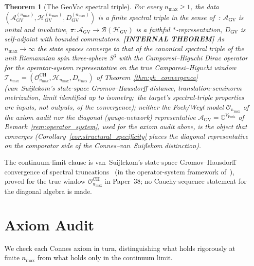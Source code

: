 \documentclass[11pt]{article}
\newtheorem{theorem}{Theorem}
\begin{document}
\begin{theorem}[The GeoVac spectral triple]
\label{thm:GV_triple}
For every $n_{\max} \ge 1$, the data
$(\mathcal{A}_{\mathrm{GV}}^{(n_{\max})},
\mathcal{H}_{\mathrm{GV}}^{(n_{\max})},
D_{\mathrm{GV}}^{(n_{\max})})$ is a finite spectral triple in the
sense of~\cite{connes1995}: $\mathcal{A}_{\mathrm{GV}}$ is unital and
involutive, $\pi: \mathcal{A}_{\mathrm{GV}} \to
\mathcal{B}(\mathcal{H}_{\mathrm{GV}})$ is a faithful
$*$-representation, $D_{\mathrm{GV}}$ is self-adjoint with bounded
commutators.  \textbf{[INTERNAL THEOREM]} As
$n_{\max} \to \infty$ the state spaces converge to that of the canonical
spectral triple of the unit Riemannian spin three-sphere $S^3$ with the
Camporesi--Higuchi Dirac operator \emph{for the operator-system
representative on the true Camporesi--Higuchi window}
$\mathcal{T}_{n_{\max}} = (\mathcal{O}^{\mathrm{CH}}_{n_{\max}}, \mathcal{H}_{n_{\max}}, D_{n_{\max}})$ of
Theorem~\ref{thm:gh_convergence} (van~Suijlekom's state-space
Gromov--Hausdorff distance, translation-seminorm metrization, limit
identified up to isometry;\ the target's spectral-triple properties are
inputs, not outputs, of the convergence); neither the Fock/Weyl model
$\mathcal{O}_{n_{\max}}$ of the axiom audit nor the diagonal
(gauge-network) representative
$\mathcal{A}_{\mathrm{GV}} = \mathbb{C}^{V_{\mathrm{Fock}}}$ of
Remark~\ref{rem:operator_system}, used for the axiom audit above, is
the object that converges (Corollary~\ref{cor:structural_specificity}
places the diagonal representative on the comparator side of the Connes--van~Suijlekom distinction).
\end{theorem}

The continuum-limit clause is van~Suijlekom's state-space
Gromov--Hausdorff convergence of spectral
truncations~\cite{vansuijlekom2021_fejer} (in the operator-system
framework of~\cite{connes_vs2021}), proved for the true window
$\mathcal{O}^{\mathrm{CH}}_{n_{\max}}$ in Paper~38; no
Cauchy-sequence statement for the
diagonal algebra is made.

\section{Axiom Audit}
\label{sec:axiom_audit}

We check each Connes axiom in turn, distinguishing what holds
rigorously at finite $n_{\max}$ from what holds only in the continuum
limit.
\end{document}
